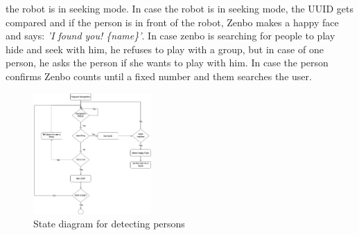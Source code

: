\documentclass[conference]{IEEEtran}
\begin{document}
the robot is in seeking mode. In case the robot is in seeking mode, the UUID gets compared and if the person is in front of the robot, Zenbo makes a happy face
and says: \textit{'I found you! \{name\}'}. In case zenbo is searching for people to play hide and seek with him, he refuses to play with a group, but 
in case of one person, he asks the person if she wants to play with him. In case the person confirms Zenbo counts until a fixed number and them searches the user.
\begin{figure}[h]  \label{fig:computerVision}
	\begin{center}
		\includegraphics[width=0.4\textwidth]{pics/computerVisionFlow.png}
	\end{center}
	\caption{State diagram for detecting persons}
\end{figure}
\end{document}
